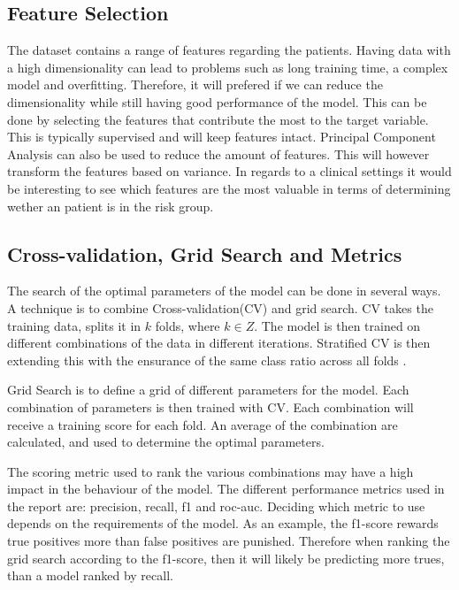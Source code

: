 \subsection{Feature Selection}
The dataset contains a range of features regarding the patients. Having data with a high dimensionality can lead to problems such as long training time, a complex model and overfitting. Therefore, it will prefered if we can reduce the dimensionality while still having good performance of the model. This can be done by selecting the features that contribute the most to the target variable. This is typically supervised and will keep features intact. Principal Component Analysis can also be used to reduce the amount of features. This will however transform the features based on variance. In regards to a clinical settings it would be interesting to see which features are the most valuable in terms of determining wether an patient is in the risk group.

\subsection{Cross-validation, Grid Search and Metrics}
The search of the optimal parameters of the model can be done in several ways. A technique is to combine Cross-validation(CV) and grid search. CV takes the training data, splits it in $k$ folds, where $k \in Z$. The model is then trained on different combinations of the data in different iterations. Stratified CV is then extending this with the ensurance of the same class ratio across all folds \cite{CV}.

Grid Search is to define a grid of different parameters for the model. Each combination of parameters is then trained with CV. Each combination will receive a training score for each fold. An average of the combination are calculated, and used to determine the optimal parameters.

The scoring metric used to rank the various combinations may have a high impact in the behaviour of the model. The  different performance metrics used in the report are: precision, recall, f1 and roc-auc. Deciding which metric to use depends on the requirements of the model. As an example, the f1-score rewards true positives more than false positives are punished. Therefore when ranking the grid search according to the f1-score, then it will likely be predicting more trues, than a model ranked by recall.    



